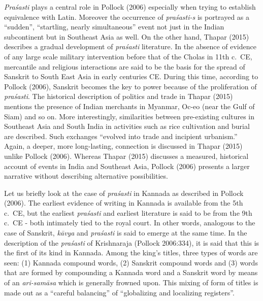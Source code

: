 {\sl Praśasti} plays a central role in Pollock (2006) especially when trying to establish equivalence with Latin. Moreover the occurrence of {\sl praśasti-s} is portrayed as a “sudden”, “startling, nearly simultaneous” event not just in the Indian subcontinent but in Southeast Asia as well. On the other hand, Thapar (2015) describes a gradual development of {\sl praśasti} literature. In the absence of evidence of any large scale military intervention before that of the Cholas in 11th c.\ CE, mercantile and religious interactions are said to be the basis for the spread of Sanskrit to South East Asia in early centuries CE\@. During this time, according to Pollock (2006), Sanskrit becomes the key to power because of the proliferation of {\sl praśasti}. The historical description of politics and trade in Thapar (2015) mentions the presence of Indian merchants in Myanmar, Oc-eo (near the Gulf of Siam) and so on. More interestingly, similarities between pre-existing cultures in Southeast Asia and South India in activities such as rice cultivation and burial are described. Such exchanges “evolved into trade and incipient urbanism.” Again, a deeper, more long-lasting, connection is discussed in Thapar (2015) unlike Pollock (2006). Whereas Thapar (2015) discusses a measured, historical account of events in India and Southeast Asia, Pollock (2006) presents a larger narrative without describing alternative possibilities.

Let us briefly look at the case of {\sl praśasti} in Kannada as described in Pollock (2006). The earliest evidence of writing in Kannada is available from the 5th c.\ CE, but the earliest {\sl praśasti} and earliest literature is said to be from the 9th c.\ CE - both intimately tied to the royal court. In other words, analogous to the case of Sanskrit, {\sl kāvya} and {\sl praśasti} is said to emerge at the same time. In the description of the {\sl praśasti} of Krishnaraja (Pollock 2006:334), it is said that this is the first of its kind in Kannada. Among the king’s titles, three types of words are seen: (1) Kannada compound words, (2) Sanskrit compound words and (3) words that are formed by compounding a Kannada word and a Sanskrit word by means of an {\sl ari-samāsa} which is generally frowned upon. This mixing of form of titles is made out as a “careful balancing” of “globalizing and localizing registers”.

